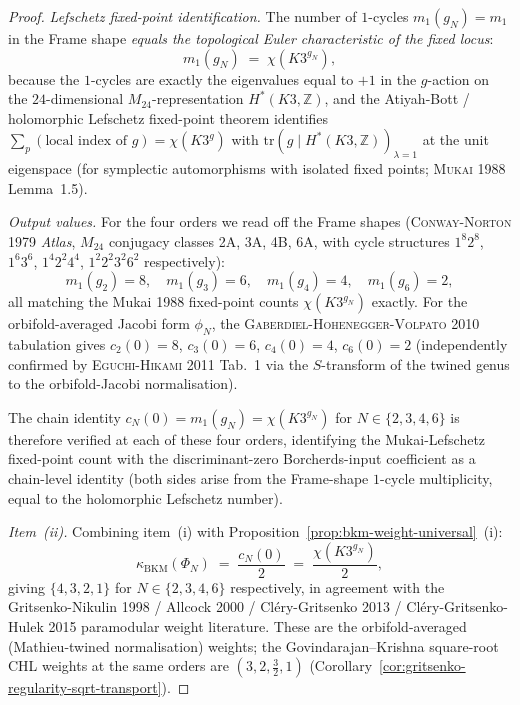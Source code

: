 \begin{proof}
\textit{Lefschetz fixed-point identification.} The number of $1$-cycles
$m_1(g_N) = m_1$ in the Frame shape \emph{equals the topological Euler
characteristic of the fixed locus}:
\[
 m_1(g_N) \;=\; \chi(K3^{g_N}),
\]
because the $1$-cycles are exactly the eigenvalues equal to $+1$ in the
$g$-action on the $24$-dimensional $M_{24}$-representation
$H^*(K3, \mathbb{Z})$, and the Atiyah-Bott / holomorphic Lefschetz
fixed-point theorem identifies $\sum_p (\text{local index of } g) = \chi(K3^g)$
with $\mathrm{tr}(g \mid H^*(K3, \mathbb{Z}))_{\lambda = 1}$ at the
unit eigenspace \textup{(}for symplectic automorphisms with isolated
fixed points; \textsc{Mukai 1988} Lemma~1.5\textup{)}.

\textit{Output values.} For the four orders we read off the Frame
shapes \textup{(}\textsc{Conway-Norton 1979} \textit{Atlas},
$M_{24}$ conjugacy classes 2A, 3A, 4B, 6A, with cycle structures
$1^8 2^8$, $1^6 3^6$, $1^4 2^2 4^4$, $1^2 2^2 3^2 6^2$ respectively\textup{)}:
\[
 m_1(g_2) = 8, \quad m_1(g_3) = 6, \quad m_1(g_4) = 4, \quad m_1(g_6) = 2,
\]
all matching the Mukai 1988 fixed-point counts $\chi(K3^{g_N})$ exactly.
For the orbifold-averaged Jacobi form $\phi_N$, the
\textsc{Gaberdiel-Hohenegger-Volpato 2010} tabulation gives
$c_2(0) = 8$, $c_3(0) = 6$, $c_4(0) = 4$, $c_6(0) = 2$
\textup{(}independently confirmed by \textsc{Eguchi-Hikami 2011}
Tab.~1 via the $S$-transform of the twined genus to the
orbifold-Jacobi normalisation\textup{)}.

The chain identity $c_N(0) = m_1(g_N) = \chi(K3^{g_N})$ for
$N \in \{2, 3, 4, 6\}$ is therefore verified at each of these four
orders, identifying the Mukai-Lefschetz fixed-point count with the
discriminant-zero Borcherds-input coefficient as a chain-level identity
(both sides arise from the Frame-shape $1$-cycle multiplicity, equal
to the holomorphic Lefschetz number).

\textit{Item~(ii).} Combining item~(i) with
Proposition~\ref{prop:bkm-weight-universal}~(i):
\[
 \kappa_{\mathrm{BKM}}(\Phi_N) \;=\; \frac{c_N(0)}{2}
 \;=\; \frac{\chi(K3^{g_N})}{2},
\]
giving $\{4, 3, 2, 1\}$ for $N \in \{2, 3, 4, 6\}$ respectively, in
agreement with the Gritsenko-Nikulin 1998 / Allcock 2000 /
Cl\'ery-Gritsenko 2013 / Cl\'ery-Gritsenko-Hulek 2015 paramodular weight
literature. These are the orbifold-averaged (Mathieu-twined
normalisation) weights; the Govindarajan--Krishna square-root CHL
weights at the same orders are $(3, 2, \tfrac32, 1)$
(Corollary~\ref{cor:gritsenko-regularity-sqrt-transport}).


\end{proof}
